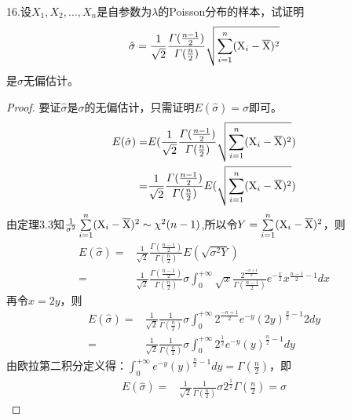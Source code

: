 \documentclass{ctexart}
\begin{document}
	\noindent 16.设$X_{1},X_{2},\dots ,X_{n}$是自参数为$\lambda$的Poisson分布的样本，试证明	
	\begin{align}
	\hat{\sigma}=\frac{1}{\sqrt{2}} \frac{\varGamma(\frac{n-1}{2})}
	{\varGamma(\frac{n}{2})}
	\sqrt{\sum_{i=1}^{n}
	(\textup{X}_{i}-\overline{\textup{X}})^2}
	\end{align}
	是$\sigma$无偏估计。
	\begin{proof}
	要证$\hat{\sigma}$是$\sigma$的无偏估计，只需证明$E(\hat{\sigma})=\sigma$即可。
	\begin{align*}
	E(\hat{\sigma})=&E(\frac{1}{\sqrt{2}} \frac{\varGamma(\frac{n-1}{2})}
	{\varGamma(\frac{n}{2})}
	\sqrt{\sum_{i=1}^{n}
	(\textup{X}_{i}-\overline{\textup{X}})^2})\\
	=&\frac{1}{\sqrt{2}} \frac{\varGamma(\frac{n-1}{2})}
	{\varGamma(\frac{n}{2})}
	E(\sqrt{\sum_{i=1}^{n}
	(\textup{X}_{i}-\overline{\textup{X}})^2})
	\end{align*}
	由定理3.3知$\frac{1}{\sigma^2}\sum\limits_{i=1}^{n}
	(\textup{X}_{i}-\overline{\textup{X}})^2\sim \chi^2(n-1)$,所以令$Y=\sum\limits_{i=1}^{n}
	(\textup{X}_{i}-\overline{\textup{X}})^2$，则
	\begin{align*}
	E(\hat{\sigma})=&\frac{1}{\sqrt{2}} \frac{\varGamma(\frac{n-1}{2})}
	{\varGamma(\frac{n}{2})}
	E(\sqrt{\sigma^{2}Y})\\
	=&\frac{1}{\sqrt{2}} \frac{\varGamma(\frac{n-1}{2})}
	{\varGamma(\frac{n}{2})}
	\sigma\int_{0}^{+\infty}\sqrt{x}\frac{2^{\frac{-n+1}{2}}}{\varGamma(\frac{n-1}{2})} e^{-\frac{x}{2}}x^{\frac{n-1}{2}-1}dx
	\end{align*}
	再令$x=2y$，则
	\begin{align*}
		E(\hat{\sigma})=&\frac{1}{\sqrt{2}} \frac{1}
		{\varGamma(\frac{n}{2})}
		\sigma\int_{0}^{+\infty}2^{\frac{-n+1}{2}} e^{-y}(2y)^{\frac{n}{2}-1}2dy\\
		=&\frac{1}{\sqrt{2}} \frac{1}
		{\varGamma(\frac{n}{2})}
		\sigma\int_{0}^{+\infty}2^{\frac{1}{2}} e^{-y}(y)^{\frac{n}{2}-1}dy
	\end{align*}
	由欧拉第二积分定义得：$\int_{0}^{+\infty}e^{-y}(y)^{\frac{n}{2}-1}dy=\varGamma(\frac{n}{2})$，即
	\begin{align*}
	E(\hat{\sigma})=&\frac{1}{\sqrt{2}} \frac{1}
	{\varGamma(\frac{n}{2})}\sigma2^{\frac{1}{2}}\varGamma(\frac{n}{2})=\sigma
	\end{align*}
	\end{proof}
\end{document}
